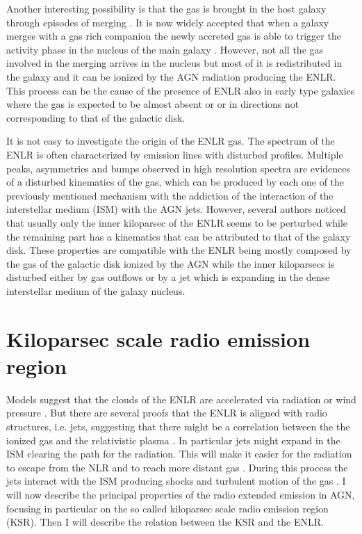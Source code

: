 \documentclass[../main.tex]{subfiles}
\begin{document}
Another interesting possibility is that the gas is brought in the host galaxy through episodes of merging \citep{Veilleux99,Ciroi05,DiMille07,Cracco11}.
It is now widely accepted that when a galaxy merges with a gas rich companion the newly accreted gas is able to trigger the activity phase in the nucleus of the main galaxy \citep{Sanders88,Hong15}.
However, not all the gas involved in the merging arrives in the nucleus but most of it is redistributed in the galaxy and it can be ionized by the AGN radiation producing the ENLR.
This process can be the cause of the presence of ENLR also in early type galaxies where the gas is expected to be almost absent or or in directions not corresponding to that of the galactic disk.

It is not easy to investigate the origin of the ENLR gas.
The spectrum of the ENLR is often characterized by emission lines with disturbed profiles.
Multiple peaks, asymmetries and bumps observed in high resolution spectra \citep{Ozaki09,Morganti07,Congiu17} are evidences of a disturbed kinematics of the gas, which can be produced by each one of the previously mentioned mechanism with the addiction of the interaction of the interstellar medium (ISM) with the AGN jets.
However, several authors \citep[e.g.][]{Unger87,Fischer17,Fischer18} noticed that usually only the inner kiloparsec of the ENLR seems to be perturbed while the remaining part has a kinematics that can be attributed to that of the galaxy disk.
These properties are compatible with the ENLR being mostly composed by the gas of the galactic disk ionized by the AGN while the inner kiloparsecs is disturbed either by gas outflows or by a jet which is expanding in the dense interstellar medium of the galaxy nucleus.



\section{Kiloparsec scale radio emission region}
\label{sec:ksr}

Models suggest that the clouds of the ENLR are accelerated via radiation or wind pressure \citep{Crenshaw00,Crenshaw00b}.
But there are several proofs that the ENLR is aligned with radio structures, i.e. jets, suggesting that there might be a correlation between the the ionized gas and the relativistic plasma \citep[e.g.][]{Unger87,Wilson94,Falcke98,Schmitt03,Schmitt03b,Morganti07,Husemann13}.
In particular jets might expand in the ISM clearing the path for the radiation.
This will make it easier for the radiation to escape from the NLR and to reach more distant gas \citep{Wilson94}.
During this process the jets interact with the ISM producing shocks and turbulent motion of the gas \citep[e.g.][]{Cracco11,Contini13,Congiu17}.
I will now describe the principal properties of the radio extended emission in AGN, focusing in particular on the so called kiloparsec scale radio emission region (KSR).
Then I will describe the relation between the KSR and the ENLR.
\end{document}
